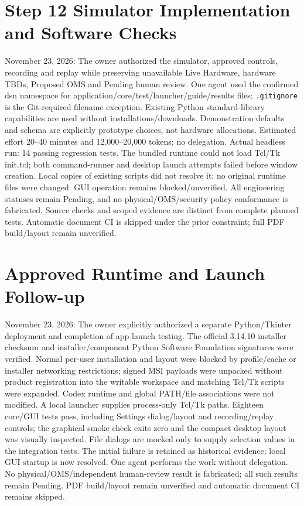 \section{Step 12 Simulator Implementation and Software Checks}
November 23, 2026: The owner authorized the simulator, approved controls, recording and replay while preserving unavailable Live Hardware, hardware TBDs, Proposed OMS and Pending human review. One agent used the confirmed dsn namespace for application/core/test/launcher/guide/results files; \texttt{.gitignore} is the Git-required filename exception. Existing Python standard-library capabilities are used without installations/downloads. Demonstration defaults and schema are explicitly prototype choices, not hardware allocations. Estimated effort 20--40 minutes and 12,000--20,000 tokens; no delegation. Actual headless run: 14 passing regression tests. The bundled runtime could not load Tcl/Tk init.tcl; both command-runner and desktop launch attempts failed before window creation. Local copies of existing scripts did not resolve it; no original runtime files were changed. GUI operation remains blocked/unverified. All engineering statuses remain Pending, and no physical/OMS/security policy conformance is fabricated. Source checks and scoped evidence are distinct from complete planned tests. Automatic document CI is skipped under the prior constraint; full PDF build/layout remain unverified.
\section{Approved Runtime and Launch Follow-up}
November 23, 2026: The owner explicitly authorized a separate Python/Tkinter deployment and completion of app launch testing. The official 3.14.10 installer checksum and installer/component Python Software Foundation signatures were verified. Normal per-user installation and layout were blocked by profile/cache or installer networking restrictions; signed MSI payloads were unpacked without product registration into the writable workspace and matching Tcl/Tk scripts were expanded. Codex runtime and global PATH/file associations were not modified. A local launcher supplies process-only Tcl/Tk paths. Eighteen core/GUI tests pass, including Settings dialog/layout and recording/replay controls; the graphical smoke check exits zero and the compact desktop layout was visually inspected. File dialogs are mocked only to supply selection values in the integration tests. The initial failure is retained as historical evidence; local GUI startup is now resolved. One agent performs the work without delegation. No physical/OMS/independent human-review result is fabricated; all such results remain Pending. PDF build/layout remain unverified and automatic document CI remains skipped.

